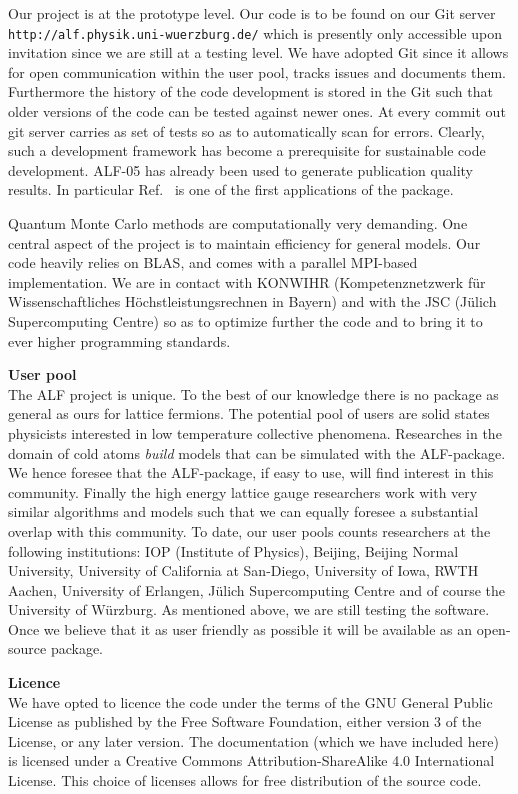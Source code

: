 \documentclass[12pt]{article}
\begin{document}
Our project is at the prototype level.  Our code is to be found  on our Git server  \texttt{http://alf.physik.uni-wuerzburg.de/} which is presently only accessible  upon invitation since we are still at a testing level.  We have adopted Git since it allows for open communication within the user pool,  tracks issues and  documents them.   Furthermore the history of the code development is stored in the Git such that older versions of the code can be tested against newer ones.   At every commit out git server carries as set of tests so as to automatically scan for errors.   Clearly, such a development framework  has  become a prerequisite for sustainable code development.  ALF-05 has already been used to generate publication quality results. In particular  Ref.~\cite{Assaad16}   is one of the first applications of the package.  

Quantum Monte Carlo methods are  computationally very demanding. One central aspect of the project is to maintain  efficiency for general models.  Our code  heavily relies on BLAS, and comes with a parallel MPI-based implementation. We are in contact with KONWIHR   (Kompetenznetzwerk f\"ur Wissenschaftliches H\"ochstleistungsrechnen in Bayern)  and with the JSC (J\"ulich Supercomputing Centre)  so as to optimize further the code and to bring  it to ever higher programming standards.  

{\bf User pool } \\ 
The ALF project  is unique. To the best of our knowledge  there is no package as general as ours for lattice fermions. The potential pool of users are solid states physicists interested in low  temperature collective phenomena.    Researches in the domain of cold atoms {\it build} models that can be simulated with the ALF-package. We hence foresee that the ALF-package, if easy to use, will find interest in this community. Finally  the high energy lattice gauge  researchers work with very similar algorithms and models such that we can equally  foresee  a substantial overlap with this community.   To date,  our user pools counts researchers at the following institutions:  IOP (Institute of Physics), Beijing,  Beijing Normal University, University of California at San-Diego,  University of Iowa,  RWTH Aachen, University of Erlangen, J\"ulich Supercomputing Centre and of course the  University of W\"urzburg.   As mentioned above,  we are still testing the software. Once we believe that it as user friendly as possible it will be available as an open-source package. 

{\bf Licence} \\ 
We have opted to licence the code under  the terms of the GNU General Public License as published by
the Free Software Foundation, either version 3 of the License, or any later version.   The documentation (which we have included here)  is licensed under a Creative Commons Attribution-ShareAlike 4.0 International License.  This choice of licenses allows for free distribution of the source code. 
\end{document}
